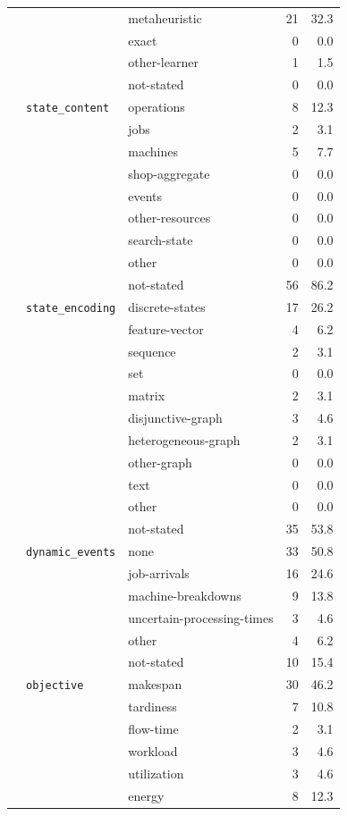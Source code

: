 \begin{longtable}{lllr@{\hspace{1.0em}}r}
 &  & metaheuristic & 21 & 32.3 \\
 &  & exact & 0 & 0.0 \\
 &  & other-learner & 1 & 1.5 \\
 &  & not-stated & 0 & 0.0 \\
 & \texttt{state\_content} & operations & 8 & 12.3 \\
 &  & jobs & 2 & 3.1 \\
 &  & machines & 5 & 7.7 \\
 &  & shop-aggregate & 0 & 0.0 \\
 &  & events & 0 & 0.0 \\
 &  & other-resources & 0 & 0.0 \\
 &  & search-state & 0 & 0.0 \\
 &  & other & 0 & 0.0 \\
 &  & not-stated & 56 & 86.2 \\
 & \texttt{state\_encoding} & discrete-states & 17 & 26.2 \\
 &  & feature-vector & 4 & 6.2 \\
 &  & sequence & 2 & 3.1 \\
 &  & set & 0 & 0.0 \\
 &  & matrix & 2 & 3.1 \\
 &  & disjunctive-graph & 3 & 4.6 \\
 &  & heterogeneous-graph & 2 & 3.1 \\
 &  & other-graph & 0 & 0.0 \\
 &  & text & 0 & 0.0 \\
 &  & other & 0 & 0.0 \\
 &  & not-stated & 35 & 53.8 \\
 & \texttt{dynamic\_events} & none & 33 & 50.8 \\
 &  & job-arrivals & 16 & 24.6 \\
 &  & machine-breakdowns & 9 & 13.8 \\
 &  & uncertain-processing-times & 3 & 4.6 \\
 &  & other & 4 & 6.2 \\
 &  & not-stated & 10 & 15.4 \\
 & \texttt{objective} & makespan & 30 & 46.2 \\
 &  & tardiness & 7 & 10.8 \\
 &  & flow-time & 2 & 3.1 \\
 &  & workload & 3 & 4.6 \\
 &  & utilization & 3 & 4.6 \\
 &  & energy & 8 & 12.3 \\

\end{longtable}
